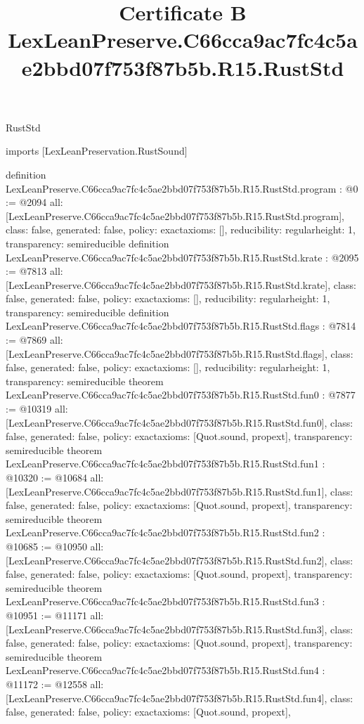 \begin{lexlean}{RustStd}
\title{Certificate B LexLeanPreserve.C66cca9ac7fc4c5ae2bbd07f753f87b5b.R15.RustStd}
\begin{coremodule}
imports [LexLeanPreservation.RustSound]

definition LexLeanPreserve.C66cca9ac7fc4c5ae2bbd07f753f87b5b.R15.RustStd.program : @0 := @2094 {
  all: [LexLeanPreserve.C66cca9ac7fc4c5ae2bbd07f753f87b5b.R15.RustStd.program],
  class: false,
  generated: false,
  policy: exact{axioms: []},
  reducibility: regular{height: 1},
  transparency: semireducible
}
definition LexLeanPreserve.C66cca9ac7fc4c5ae2bbd07f753f87b5b.R15.RustStd.krate : @2095 := @7813 {
  all: [LexLeanPreserve.C66cca9ac7fc4c5ae2bbd07f753f87b5b.R15.RustStd.krate],
  class: false,
  generated: false,
  policy: exact{axioms: []},
  reducibility: regular{height: 1},
  transparency: semireducible
}
definition LexLeanPreserve.C66cca9ac7fc4c5ae2bbd07f753f87b5b.R15.RustStd.flags : @7814 := @7869 {
  all: [LexLeanPreserve.C66cca9ac7fc4c5ae2bbd07f753f87b5b.R15.RustStd.flags],
  class: false,
  generated: false,
  policy: exact{axioms: []},
  reducibility: regular{height: 1},
  transparency: semireducible
}
theorem LexLeanPreserve.C66cca9ac7fc4c5ae2bbd07f753f87b5b.R15.RustStd.fun0 : @7877 := @10319 {
  all: [LexLeanPreserve.C66cca9ac7fc4c5ae2bbd07f753f87b5b.R15.RustStd.fun0],
  class: false,
  generated: false,
  policy: exact{axioms: [Quot.sound, propext]},
  transparency: semireducible
}
theorem LexLeanPreserve.C66cca9ac7fc4c5ae2bbd07f753f87b5b.R15.RustStd.fun1 : @10320 := @10684 {
  all: [LexLeanPreserve.C66cca9ac7fc4c5ae2bbd07f753f87b5b.R15.RustStd.fun1],
  class: false,
  generated: false,
  policy: exact{axioms: [Quot.sound, propext]},
  transparency: semireducible
}
theorem LexLeanPreserve.C66cca9ac7fc4c5ae2bbd07f753f87b5b.R15.RustStd.fun2 : @10685 := @10950 {
  all: [LexLeanPreserve.C66cca9ac7fc4c5ae2bbd07f753f87b5b.R15.RustStd.fun2],
  class: false,
  generated: false,
  policy: exact{axioms: [Quot.sound, propext]},
  transparency: semireducible
}
theorem LexLeanPreserve.C66cca9ac7fc4c5ae2bbd07f753f87b5b.R15.RustStd.fun3 : @10951 := @11171 {
  all: [LexLeanPreserve.C66cca9ac7fc4c5ae2bbd07f753f87b5b.R15.RustStd.fun3],
  class: false,
  generated: false,
  policy: exact{axioms: [Quot.sound, propext]},
  transparency: semireducible
}
theorem LexLeanPreserve.C66cca9ac7fc4c5ae2bbd07f753f87b5b.R15.RustStd.fun4 : @11172 := @12558 {
  all: [LexLeanPreserve.C66cca9ac7fc4c5ae2bbd07f753f87b5b.R15.RustStd.fun4],
  class: false,
  generated: false,
  policy: exact{axioms: [Quot.sound, propext]},
}
\end{coremodule}
\end{lexlean}
